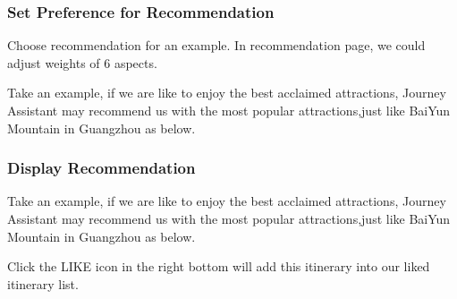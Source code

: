\documentclass[10pt]{article}
\begin{document}
\subsubsection{Set Preference for Recommendation}
Choose recommendation for an example. In recommendation page, we could adjust weights of  6 aspects.

Take an example, if we are like to enjoy the best acclaimed attractions, Journey Assistant may recommend us with the most popular attractions,just like BaiYun Mountain in Guangzhou as below.

\subsubsection{Display Recommendation}
Take an example, if we are like to enjoy the best acclaimed attractions, Journey Assistant may recommend us with the most popular attractions,just like BaiYun Mountain in Guangzhou as below.

Click the LIKE icon in the right bottom will add this itinerary into our liked itinerary list.
\end{document}
